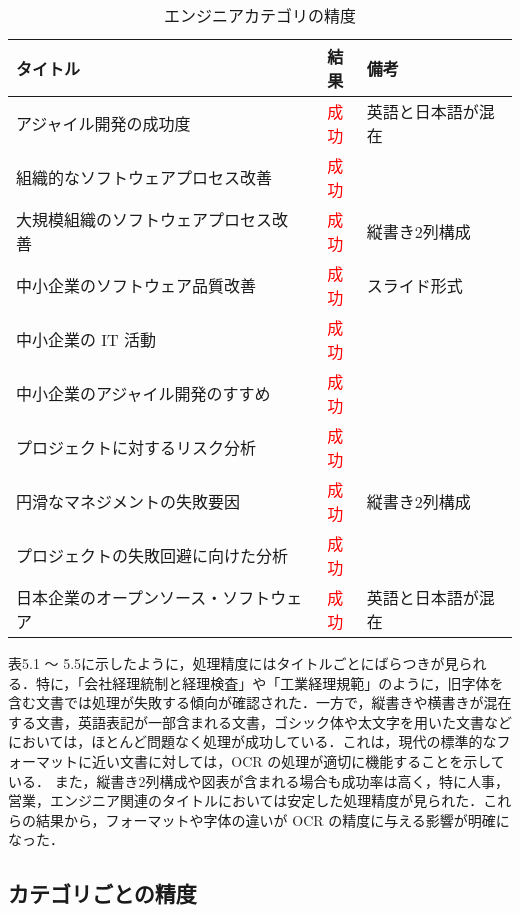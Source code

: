 \begin{table}[h]
  \label{tab:doc_engineer}
  \begin{center}
  \begin{tabular}{|l|c|l|}
    \hline
    \textbf{タイトル} & \textbf{結果} & \textbf{備考} \\ \hline
    アジャイル開発の成功度 & \textcolor{red}{成功} & 英語と日本語が混在 \\ \hline
    組織的なソフトウェアプロセス改善 & \textcolor{red}{成功} &  \\ \hline
    大規模組織のソフトウェアプロセス改善 & \textcolor{red}{成功} & 縦書き2列構成 \\ \hline
    中小企業のソフトウェア品質改善 & \textcolor{red}{成功} & スライド形式 \\ \hline
    中小企業の IT 活動 & \textcolor{red}{成功} & \\ \hline
    中小企業のアジャイル開発のすすめ & \textcolor{red}{成功} & \\ \hline
    プロジェクトに対するリスク分析 & \textcolor{red}{成功} & \\ \hline
    円滑なマネジメントの失敗要因 & \textcolor{red}{成功} & 縦書き2列構成 \\ \hline
    プロジェクトの失敗回避に向けた分析 & \textcolor{red}{成功} & \\ \hline
    日本企業のオープンソース・ソフトウェア & \textcolor{red}{成功} & 英語と日本語が混在 \\ \hline
  \end{tabular}
  \end{center}
  \caption{エンジニアカテゴリの精度}
\end{table}

表5.1 ～ 5.5に示したように，処理精度にはタイトルごとにばらつきが見られる．特に，「会社経理統制と経理検査」や「工業経理規範」のように，旧字体を含む文書では処理が失敗する傾向が確認された．一方で，縦書きや横書きが混在する文書，英語表記が一部含まれる文書，ゴシック体や太文字を用いた文書などにおいては，ほとんど問題なく処理が成功している．これは，現代の標準的なフォーマットに近い文書に対しては，OCR の処理が適切に機能することを示している．
また，縦書き2列構成や図表が含まれる場合も成功率は高く，特に人事，営業，エンジニア関連のタイトルにおいては安定した処理精度が見られた．これらの結果から，フォーマットや字体の違いが OCR の精度に与える影響が明確になった．

\clearpage
\subsection{カテゴリごとの精度}
\label{subsec:category}

